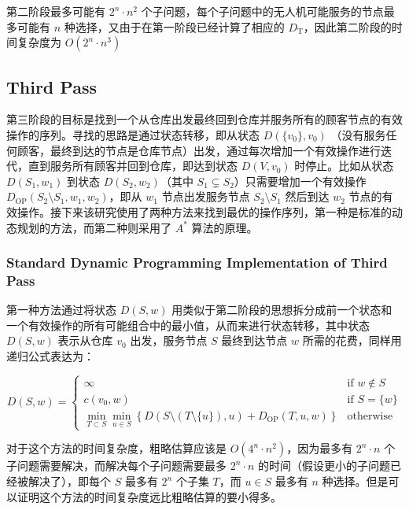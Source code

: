 \documentclass[fontset=none]{ctexart}
\begin{document}
第二阶段最多可能有 $2^n \cdot n^2$ 个子问题，每个子问题中的无人机可能服务的节点最多可能有 $n$ 种选择，又由于在第一阶段已经计算了相应的 $D_{\text{T}}$，因此第二阶段的时间复杂度为 $O(2^n \cdot n^3)$

\subsection{Third Pass}

第三阶段的目标是找到一个从仓库出发最终回到仓库并服务所有的顾客节点的有效操作的序列。寻找的思路是通过状态转移，即从状态 $D(\{v_0\}, v_0)$ （没有服务任何顾客，最终到达的节点是仓库节点）出发，通过每次增加一个有效操作进行迭代，直到服务所有顾客并回到仓库，即达到状态 $D(V, v_0)$ 时停止。比如从状态 $D(S_1, w_1)$ 到状态 $D(S_2, w_2)$（其中 $S_1 \subsetneq S_2$）只需要增加一个有效操作 $D_{\text{OP}}(S_2 \setminus S_1, w_1, w_2)$，即从 $w_1$ 节点出发服务节点 $S_2 \setminus S_1$ 然后到达 $w_2$ 节点的有效操作。接下来该研究使用了两种方法来找到最优的操作序列，第一种是标准的动态规划的方法，而第二种则采用了 $A^*$ 算法的原理\cite{hartCorrectionFormalBasis1972, hartFormalBasisHeuristic1968}。

\subsubsection{Standard Dynamic Programming Implementation of Third Pass}\label{sec:third-pass-method-1}

第一种方法通过将状态 $D(S, w)$ 用类似于第二阶段的思想拆分成前一个状态和一个有效操作的所有可能组合中的最小值，从而来进行状态转移，其中状态$D(S, w)$ 表示从仓库 $v_0$ 出发，服务节点 $S$ 最终到达节点 $w$ 所需的花费，同样用递归公式表达为：

\begin{equation}
    D(S, w) =
    \begin{cases}
        \infty & \text{if } w \notin S \\
        c(v_0, w) & \text{if } S = \{w\} \\
        \min_{T \subset S} \min_{u \in S}\left\{D(S \setminus (T \setminus \{u\}), u) + D_{\text{OP}}(T, u, w)\right\} & \text{otherwise}
    \end{cases}
    \label{eq:third-pass-method-1}
\end{equation}

对于这个方法的时间复杂度，粗略估算应该是 $O(4^n \cdot n^2)$，因为最多有 $2^n \cdot n$ 个子问题需要解决，而解决每个子问题需要最多 $2^n \cdot n$ 的时间（假设更小的子问题已经被解决了），即每个 $S$ 最多有 $2^n$ 个子集 $T$，而 $u \in S$ 最多有 $n$ 种选择。但是可以证明这个方法的时间复杂度远比粗略估算的要小得多。
\end{document}
